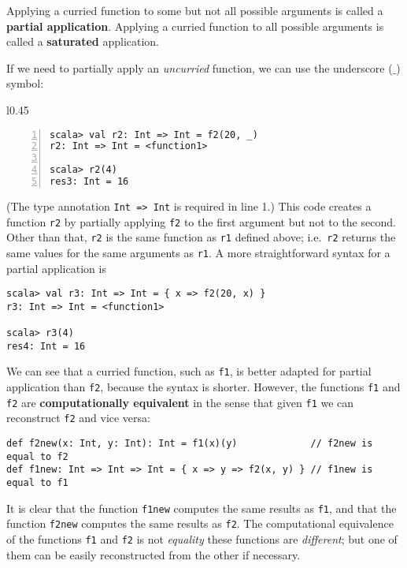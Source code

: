 Applying a curried function to some but not all possible arguments
is called a \textbf{partial application}.
Applying a curried function to all possible arguments is called a
\textbf{saturated} application.

If we need to partially apply an \emph{uncurried} function, we can
use the underscore ($\_$) symbol:

\begin{wrapfigure}{l}{0.45\columnwidth}%
\vspace{-0.85\baselineskip}
\begin{lstlisting}[numbers=left,numberstyle={\small}]
scala> val r2: Int => Int = f2(20, _)
r2: Int => Int = <function1>

scala> r2(4)
res3: Int = 16
\end{lstlisting}
\vspace{-0.95\baselineskip}
\end{wrapfigure}%

\noindent (The type annotation \lstinline!Int => Int! is required
in line 1.) This code creates a function \lstinline!r2! by partially
applying \lstinline!f2! to the first argument but not to the second.
Other than that, \lstinline!r2! is the same function as \lstinline!r1!
defined above; i.e.~\lstinline!r2! returns the same values for the
same arguments as \lstinline!r1!. A more straightforward syntax for
a partial application is
\begin{lstlisting}
scala> val r3: Int => Int = { x => f2(20, x) }
r3: Int => Int = <function1>

scala> r3(4)
res4: Int = 16
\end{lstlisting}

We can see that a curried function, such as \lstinline!f1!, is better
adapted for partial application than \lstinline!f2!, because the
syntax is shorter. However, the functions \lstinline!f1! and \lstinline!f2!
are \textbf{computationally equivalent}
in the sense that given \lstinline!f1! we can reconstruct \lstinline!f2!
and vice versa:
\begin{lstlisting}
def f2new(x: Int, y: Int): Int = f1(x)(y)             // f2new is equal to f2
def f1new: Int => Int => Int = { x => y => f2(x, y) } // f1new is equal to f1
\end{lstlisting}
It is clear that the function \lstinline!f1new! computes the same
results as \lstinline!f1!, and that the function \lstinline!f2new!
computes the same results as \lstinline!f2!. The computational equivalence
of the functions \lstinline!f1! and \lstinline!f2! is not \emph{equality}
 \textendash{}  these functions are \emph{different}; but one of them
can be easily reconstructed from the other if necessary. 

